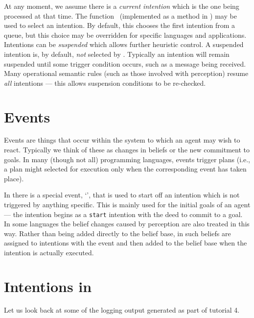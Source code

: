\documentclass[a4]{article}
\begin{document}
At any moment, we assume there is a \emph{current intention} which is
the one being processed at that time.  The function
\AILselectintention\ (implemented as a method in \ail) may be used
to select an intention.  By default, this chooses the first intention
from a queue, but this choice may be overridden for specific languages
and applications.  Intentions can be
\emph{suspended} which allows further
heuristic control.  A suspended intention is, by default, \emph{not}
selected by \AILselectintention.  Typically an intention will remain
suspended until some trigger condition occurs, such as a message being
received.  Many operational semantic rules (such as those involved
with perception) resume \emph{all}
intentions --- this allows suspension conditions to be re-checked.

\section{Events}

Events are things that occur within the system to which an agent may
wish to react.  Typically we think of these as changes in
beliefs or the new commitment to
goals.  In many (though not all) programming
languages, events trigger plans (i.e., a plan might selected for
execution only when the corresponding event has taken place).

In \ail{} there is a special event, `\AILstart{}', that is used to
start off an intention which is not triggered by anything specific.
This is mainly used for the initial goals of an agent --- the
intention begins as a \texttt{start} intention with the deed to commit
to a goal.  In some languages the belief changes
caused by perception are also treated in this way.  Rather than being
added directly to the belief base, in \ail{} such beliefs are assigned
to intentions with the event \AILstart{} and then added to the belief
base when the intention is actually executed.

\section{Intentions in \gwendolen}

Let us look back at some of the logging output generated as part of tutorial 4.
\end{document}
